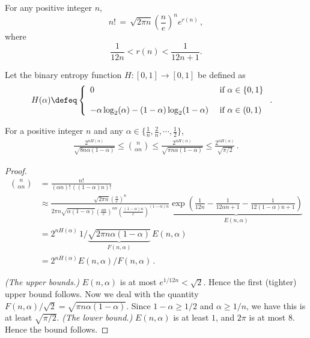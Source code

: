 \begin{theorem}
For any positive integer $n$,
\[
n! \, = \, \sqrt{2\pi n}(\frac{n}{e})^n e^{r(n)}\, ,
\]where
\[
\frac{1}{12n} < r(n) < \frac{1}{12n + 1}.
\]
\end{theorem}

Let the binary entropy function $H : [0, 1] \rightarrow [0, 1]$ be defined as
\begin{align*}
H(\alpha) & \defeq \left\{ \begin{array}{ll}0 & \text{ if } \alpha \in \{0, 1\}\\
\\
-\alpha \log_2(\alpha) - (1-\alpha) \log_2(1-\alpha) & \text{ if } \alpha \in (0, 1)\end{array} \right. .
\end{align*}

\begin{corollary}\label{coro:nchoosek_1}
For a positive integer $n$ and any $\alpha \in \{\frac{1}{n}, \frac{2}{n}, \cdots, \frac{1}{2} \}$, 
\begin{align}\label{eq:nck}
  \frac{2^{n H(\alpha)}}{\sqrt{8 n\alpha (1-\alpha)}} 
  \leq {n \choose \alpha n} 
  \leq \frac{2^{n H(\alpha)}}{\sqrt{\pi n\alpha (1-\alpha)}} 
  \leq \frac{2^{n H(\alpha)}}{\sqrt{\pi/2}} \, .
\end{align}
\end{corollary}

\begin{proof}
\begin{align*}
{n \choose \alpha n}
&= \frac{n!}{(\alpha n)!\, \left( (1-\alpha)n \right)! }\\
&\approx \frac{\sqrt{2\pi n}(\frac{n}{e})^n}{2\pi n\sqrt{\alpha (1-\alpha)}(\frac{\alpha n}{e})^{\alpha n}(\frac{(1-\alpha)n}{e})^{(1-\alpha)n} } \underbrace{ \exp\left( \frac{1}{12n} - \frac{1}{12\alpha n + 1} - \frac{1}{12(1-\alpha)n+1}\right) }_{ E(n,\alpha) } \\
&= 2^{n H(\alpha)} \, 1/\underbrace{ \sqrt{2 \pi n\alpha (1-\alpha)} }_{F(n, \alpha)} \, E(n, \alpha) \\
&=2^{n H(\alpha)} E(n, \alpha)/F(n, \alpha) \, .
\end{align*}

\emph{(The upper bounds.)} $E(n,\alpha)$ is at most $e^{1/12 n} < \sqrt{2}$. Hence the first (tighter) upper bound follows. Now we deal with the quantity $F(n, \alpha)/\sqrt{2} = \sqrt{\pi n \alpha (1-\alpha)}$. Since $1-\alpha \geq 1/2$ and $\alpha \geq 1/n$, we have this is at least $ \sqrt{\pi/2}$. \emph{(The lower bound.)} $E(n, \alpha)$ is at least $1$, and $2\pi$ is at most $8$. Hence the bound follows.

\end{proof}

